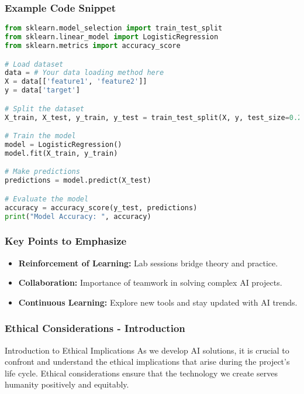 \documentclass[aspectratio=169]{beamer}
\begin{document}
\begin{frame}[fragile]
    \frametitle{Example Code Snippet}
    \begin{lstlisting}[language=Python]
from sklearn.model_selection import train_test_split
from sklearn.linear_model import LogisticRegression
from sklearn.metrics import accuracy_score

# Load dataset
data = # Your data loading method here
X = data[['feature1', 'feature2']]
y = data['target']

# Split the dataset
X_train, X_test, y_train, y_test = train_test_split(X, y, test_size=0.2)

# Train the model
model = LogisticRegression()
model.fit(X_train, y_train)

# Make predictions
predictions = model.predict(X_test)

# Evaluate the model
accuracy = accuracy_score(y_test, predictions)
print("Model Accuracy: ", accuracy)
    \end{lstlisting}
\end{frame}

\begin{frame}
    \frametitle{Key Points to Emphasize}
    \begin{itemize}
        \item \textbf{Reinforcement of Learning:} Lab sessions bridge theory and practice.
        \item \textbf{Collaboration:} Importance of teamwork in solving complex AI projects.
        \item \textbf{Continuous Learning:} Explore new tools and stay updated with AI trends.
    \end{itemize}
\end{frame}

\begin{frame}[fragile]
    \frametitle{Ethical Considerations - Introduction}
    \begin{block}{Introduction to Ethical Implications}
        As we develop AI solutions, it is crucial to confront and understand the ethical implications that arise during the project's life cycle. Ethical considerations ensure that the technology we create serves humanity positively and equitably.
    \end{block}
\end{frame}
\end{document}
